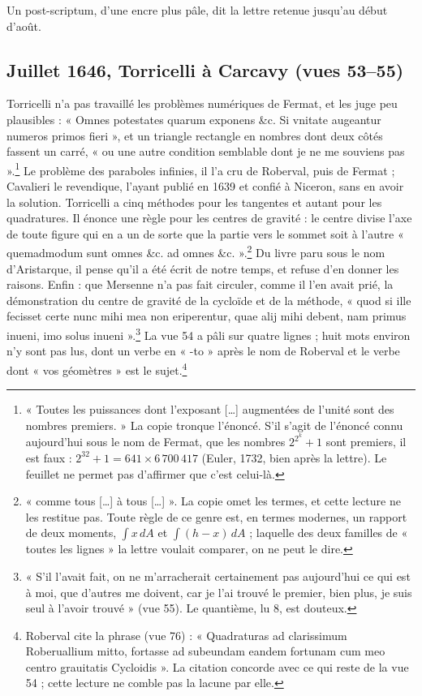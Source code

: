 \documentclass[11pt,a4paper]{article}
\begin{document}
Un post-scriptum, d'une encre plus pâle, dit la lettre retenue jusqu'au début
d'août.

\subsection*{Juillet 1646, Torricelli à Carcavy (vues 53--55)}

Torricelli n'a pas travaillé les problèmes numériques de Fermat, et les juge
peu plausibles : « Omnes potestates quarum exponens \&c. Si vnitate augeantur
numeros primos fieri », et un triangle rectangle en nombres dont deux côtés
fassent un carré, « ou une autre condition semblable dont je ne me souviens
pas ».\footnote{« Toutes les puissances dont l'exposant [\ldots] augmentées de
l'unité sont des nombres premiers. » La copie tronque l'énoncé. S'il s'agit de
l'énoncé connu aujourd'hui sous le nom de Fermat, que les nombres $2^{2^k}+1$
sont premiers, il est faux : $2^{32}+1 = 641\times 6\,700\,417$ (Euler, 1732,
bien après la lettre). Le feuillet ne permet pas d'affirmer que c'est celui-là.}
Le problème des paraboles infinies, il l'a cru de Roberval, puis de Fermat ;
Cavalieri le revendique, l'ayant publié en 1639 et confié à Niceron, sans en avoir
la solution. Torricelli a cinq méthodes pour les tangentes et autant pour les
quadratures. Il énonce une règle pour les centres de gravité : le centre divise
l'axe de toute figure qui en a un de sorte que la partie vers le sommet soit à
l'autre « quemadmodum sunt omnes \&c. ad omnes \&c. ».\footnote{« comme tous
[\ldots] à tous [\ldots] ». La copie omet les termes, et cette lecture ne les
restitue pas. Toute règle de ce genre est, en termes modernes, un rapport de deux
moments, $\int x\,dA$ et $\int (h-x)\,dA$ ; laquelle des deux familles de
« toutes les lignes » la lettre voulait comparer, on ne peut le dire.} Du
livre paru sous le nom d'Aristarque, il pense qu'il a été écrit de notre temps,
et refuse d'en donner les raisons.
Enfin : que Mersenne n'a pas fait circuler, comme il l'en avait prié, la
démonstration du centre de gravité de la cycloïde et de la méthode, « quod si
ille fecisset certe nunc mihi mea non eriperentur, quae alij mihi debent, nam
primus inueni, imo solus inueni ».\footnote{« S'il l'avait fait, on ne
m'arracherait certainement pas aujourd'hui ce qui est à moi, que d'autres me
doivent, car je l'ai trouvé le premier, bien plus, je suis seul à l'avoir
trouvé » (vue 55). Le quantième, lu 8, est douteux.} La vue 54 a pâli sur quatre
lignes ; huit mots environ n'y sont pas lus, dont un verbe en « -to » après le nom de
Roberval et le verbe dont « vos géomètres » est le sujet.\footnote{Roberval cite
la phrase (vue 76) : « Quadraturas ad clarissimum Roberuallium mitto, fortasse ad
subeundam eandem fortunam cum meo centro grauitatis Cycloidis ». La citation
concorde avec ce qui reste de la vue 54 ; cette lecture ne comble pas la lacune
par elle.}
\end{document}

